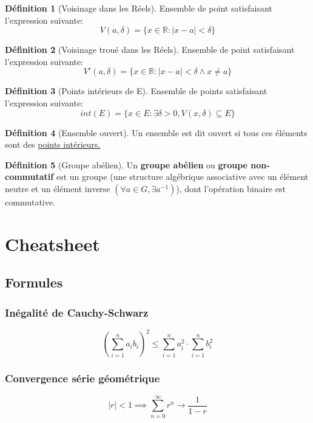 \documentclass[12pt]{book}
\let\Bbb\mathbb
\newcommand\todo[1]{\phantom{#1}}
\theoremstyle{definition}
\newtheorem{definition}{Définition}[section]
\begin{document}
\begin{definition}[Voisinage dans les Réels]
    \label{def:voisinage_reels}
    Ensemble de point satisfaisant l'expression
    suivante: $$V(a, \delta) = \{ x \in \Bbb R : |x - a| < \delta \}$$
\end{definition}

\begin{definition}[Voisinage troué dans les Réels]
    \label{def:voisinage_troue_reels}
    Ensemble de point satisfaisant l'expression
    suivante: $$V'(a, \delta) = \{ x \in \Bbb R : |x - a| < \delta \land x \neq a \}$$
\end{definition}

\begin{definition}[Points intérieurs de E]
    \label{def:point_int}
    Ensemble de points satisfaisant l'expression
    suivante: $$int(E) = \{ x \in E : \exists \delta > 0, V(x, \delta) \subseteq E \} $$
\end{definition}

\begin{definition}[Ensemble ouvert]
    \label{def:ensemble_ouvert}
    Un ensemble est dit ouvert si tous ces éléments sont des \hyperref[def:point_int]{points intérieurs.}
\end{definition}

\begin{definition}[Groupe abélien]
    \label{def:groupe_abelien}
    Un \textbf{groupe abélien} ou \textbf{groupe non-commutatif} est un groupe
    (une structure algébrique associative avec un élément neutre et un élément inverse $(\forall a \in G, \exists a^{-1})$), 
    dont l'opération binaire est commutative.
\end{definition}
\todo{Add reference}

\chapter{Cheatsheet}
\section{Formules}
\subsection{Inégalité de Cauchy-Schwarz}
$$(\sum_{i=1}^{n} a_ib_i)^2 \leq \sum_{i=1}^{n} a_i^2 \cdot \sum_{i=1}^{n} b_i ^ 2$$ 
\subsection{Convergence série géométrique}
$$|r| < 1 \implies \sum_{n=0}^{\infty} r^n \to \frac{1}{1 - r} $$
\end{document}
